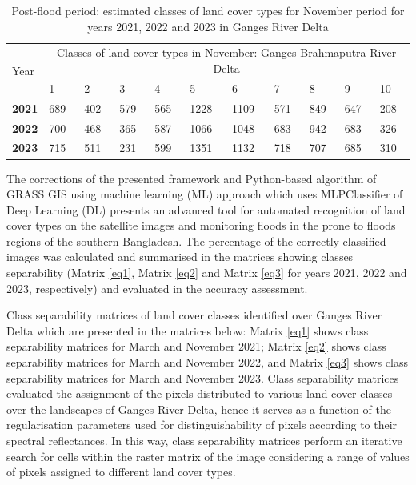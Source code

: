 \documentclass[water,article,submit,pdftex,moreauthors]{Definitions/mdpi}
\begin{document}
\begin{table}[H]
  \centering
  \begin{tabularx}{\textwidth}{p{0.9cm}p{0.9cm}p{0.9cm}p{0.9cm}p{0.9cm}p{0.9cm}p{0.9cm}p{0.9cm}p{0.9cm}p{0.9cm}p{0.9cm}}
  \toprule
  \multirow{2}{*}{Year} & \multicolumn{10}{c}{Classes of land cover types in November: Ganges-Brahmaputra River Delta} \\
     & 1 & 2 & 3 & 4 & 5 & 6 & 7 & 8 & 9 & 10 \\
    \midrule
    \textbf{2021} & 689 & 402 & 579 & 565 & 1228 & 1109 & 571 & 849 & 647 & 208 \\
    \textbf{2022} & 700 & 468 & 365 & 587 & 1066 & 1048 & 683 & 942 & 683 & 326 \\
     \textbf{2023} & 715 & 511 & 231 & 599 & 1351 & 1132 & 718 & 707 & 685 & 310 \\
\bottomrule
\end{tabularx}
  \caption{Post-flood period: estimated classes of land cover types for November period for years 2021, 2022 and 2023 in Ganges River Delta}
  \label{tab02}
\end{table}

The corrections of the presented framework and Python-based algorithm of GRASS GIS using machine learning (ML) approach which uses MLPClassifier of Deep Learning (DL) presents an advanced tool for automated recognition of land cover types on the satellite images and monitoring floods in the prone to floods regions of the southern Bangladesh. The percentage of the correctly classified images was calculated and summarised in the matrices showing classes separability (Matrix \ref{eq1}, Matrix \ref{eq2} and Matrix \ref{eq3} for years 2021, 2022 and 2023, respectively) and evaluated in the accuracy assessment. 

Class separability matrices of land cover classes identified over Ganges River Delta which are presented in the matrices below: Matrix \ref{eq1} shows class separability matrices for March and November 2021; Matrix \ref{eq2} shows class separability matrices for March and November 2022, and Matrix \ref{eq3} shows class separability matrices for March and November 2023. Class separability matrices evaluated the assignment of the pixels distributed to various land cover classes over the landscapes of Ganges River Delta, hence it serves as a function of the regularisation parameters used for distinguishability of pixels according to their spectral reflectances. In this way, class separability matrices perform an iterative search for cells within the raster matrix of the image considering a range of values of pixels assigned to different land cover types.
\end{document}
